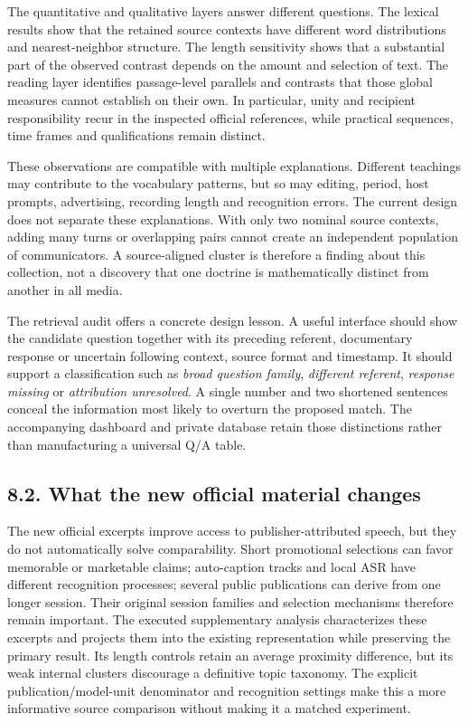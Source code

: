 \documentclass[
  11pt,
]{article}
\begin{document}
The quantitative and qualitative layers answer different questions. The
lexical results show that the retained source contexts have different
word distributions and nearest-neighbor structure. The length
sensitivity shows that a substantial part of the observed contrast
depends on the amount and selection of text. The reading layer
identifies passage-level parallels and contrasts that those global
measures cannot establish on their own. In particular, unity and
recipient responsibility recur in the inspected official references,
while practical sequences, time frames and qualifications remain
distinct.

These observations are compatible with multiple explanations. Different
teachings may contribute to the vocabulary patterns, but so may editing,
period, host prompts, advertising, recording length and recognition
errors. The current design does not separate these explanations. With
only two nominal source contexts, adding many turns or overlapping pairs
cannot create an independent population of communicators. A
source-aligned cluster is therefore a finding about this collection, not
a discovery that one doctrine is mathematically distinct from another in
all media.

The retrieval audit offers a concrete design lesson. A useful interface
should show the candidate question together with its preceding referent,
documentary response or uncertain following context, source format and
timestamp. It should support a classification such as \emph{broad
question family}, \emph{different referent}, \emph{response missing} or
\emph{attribution unresolved}. A single number and two shortened
sentences conceal the information most likely to overturn the proposed
match. The accompanying dashboard and private database retain those
distinctions rather than manufacturing a universal Q/A table.

\FloatBarrier

\subsection{8.2. What the new official material
changes}\label{what-the-new-official-material-changes}

The new official excerpts improve access to publisher-attributed speech,
but they do not automatically solve comparability. Short promotional
selections can favor memorable or marketable claims; auto-caption tracks
and local ASR have different recognition processes; several public
publications can derive from one longer session. Their original session
families and selection mechanisms therefore remain important. The
executed supplementary analysis characterizes these excerpts and
projects them into the existing representation while preserving the
primary result. Its length controls retain an average proximity
difference, but its weak internal clusters discourage a definitive topic
taxonomy. The explicit publication/model-unit denominator and
recognition settings make this a more informative source comparison
without making it a matched experiment.
\end{document}
